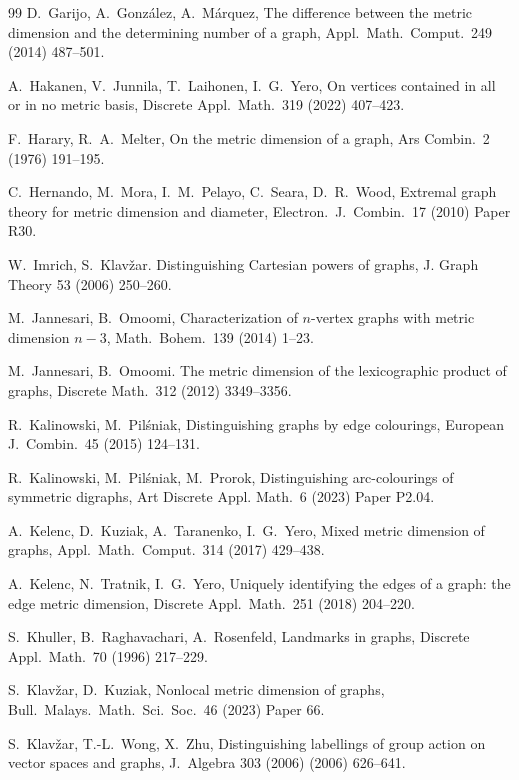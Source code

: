 \documentclass[12pt]{article}
\begin{document}
\begin{thebibliography}{99}
D.~Garijo, A.~Gonz\'alez, A.~M\'arquez,
The difference between the metric dimension and the determining number of a graph,
Appl.\ Math.\ Comput.\ 249 (2014) 487--501.

A.~Hakanen, V.~Junnila, T.~Laihonen, I.~G.~Yero,
On vertices contained in all or in no metric basis, 
Discrete Appl.\ Math.\ 319 (2022) 407--423.

F.~Harary, R.~A.~Melter,
On the metric dimension of a graph, 
Ars Combin.\ 2 (1976) 191--195.  

C.~Hernando, M.~Mora, I.~M.~Pelayo, C.~Seara, D.~R.~Wood,
Extremal graph theory for metric dimension and diameter, 
Electron.\ J.\ Combin.\ 17 (2010) Paper R30. 

W.~Imrich, S.~Klav\v{z}ar. Distinguishing Cartesian powers of graphs, 
J. Graph Theory 53 (2006) 250--260. 

M.~Jannesari, B.~Omoomi, 
Characterization of $n$-vertex graphs with metric dimension $n - 3$, 
Math.\ Bohem.\ 139 (2014) 1--23. 

M.~Jannesari, B.~Omoomi. 
The metric dimension of the lexicographic product of graphs, 
Discrete Math.\ 312 (2012) 3349--3356.  

R.~Kalinowski, M.~Pil\'{s}niak,
Distinguishing graphs by edge colourings, 
European J.\ Combin.\ 45 (2015) 124--131.  

R.~Kalinowski, M.~Pil\'{s}niak, M.~Prorok,
Distinguishing arc-colourings of symmetric digraphs, 
Art Discrete Appl. Math.\ 6 (2023) Paper P2.04. 

A.~Kelenc,  D.~Kuziak, A.~Taranenko, I.~G.~Yero,
Mixed metric dimension of graphs, 
Appl.\ Math.\ Comput.\ 314 (2017) 429--438.  

A.~Kelenc, N.~Tratnik, I.~G.~Yero, 
Uniquely identifying the edges of a graph: the edge metric dimension,
Discrete Appl.\ Math.\ 251 (2018) 204--220.

S.~Khuller, B.~Raghavachari, A.~Rosenfeld, 
Landmarks in graphs, 
Discrete Appl.\ Math.\ 70 (1996) 217--229. 

S.~Klav\v{z}ar, D.~Kuziak,
Nonlocal metric dimension of graphs, 
Bull.\ Malays.\ Math.\ Sci.\ Soc.\ 46 (2023) Paper 66.

S.~Klav\v{z}ar, T.-L.~Wong, X.~Zhu, 
Distinguishing labellings of group action on vector spaces and graphs,
J.\ Algebra 303 (2006) (2006) 626--641. 


\end{thebibliography}
\end{document}
